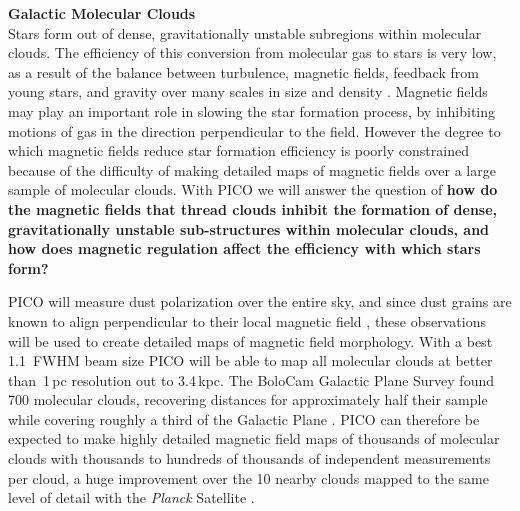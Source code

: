 \documentclass[PICOReport.tex]{subfiles}
\begin{document}
{\bf Galactic Molecular Clouds} \\[0.3cm]
Stars form out of dense, gravitationally unstable subregions within molecular clouds. The efficiency of this conversion from molecular gas to stars is very low, as a result of the balance between turbulence, magnetic fields, feedback from young stars, and gravity over many scales in size and density \citep{McKee2007}.  Magnetic fields may play an important role in slowing the star formation process, by inhibiting motions of gas in the direction perpendicular to the field. However the degree to which 
magnetic fields reduce star formation efficiency is poorly constrained because of the difficulty of making detailed maps of magnetic fields over a large sample of molecular clouds.  With PICO we will answer the question of {\bf how do the magnetic fields that thread clouds inhibit the formation of dense, gravitationally unstable sub-structures within molecular clouds, and how does magnetic regulation affect the efficiency with which stars form?}

PICO will measure dust polarization over the entire sky, and since dust grains are known to align perpendicular to their local magnetic field \citep{Lazarian2007b,Andersson2015}, these observations will be used to create detailed maps of magnetic field morphology. With a best 1.1\arcmin~FWHM beam size PICO will be able to map all molecular clouds at better than \,1\,pc resolution out to 3.4\,kpc.  The BoloCam Galactic Plane Survey found 700 molecular clouds, recovering distances for approximately half their sample while covering roughly a third of the Galactic Plane \citep{EllsworthBowers2015}. PICO can therefore be expected to make highly detailed magnetic field maps of thousands of molecular clouds with thousands to hundreds of thousands of independent measurements per cloud, a huge improvement over the 10 nearby clouds mapped to the same level of detail with the {\em Planck} Satellite \cite{Planck:XXXV}.
\end{document}
